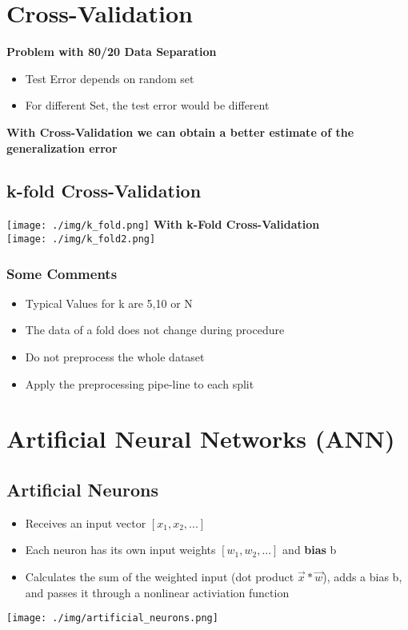 \section{Cross-Validation}
\textbf{Problem with 80/20 Data Separation}
\begin{itemize}
    \item Test Error depends on random set
    \item For different Set, the test error would be different
\end{itemize}
\textbf{With Cross-Validation we can obtain a better estimate of the generalization error}
\subsection{k-fold Cross-Validation}
\texttt{[image: ./img/k\_fold.png]}
\textbf{With k-Fold Cross-Validation}\\
\texttt{[image: ./img/k\_fold2.png]}

\subsubsection{Some Comments}
\begin{itemize}
    \item Typical Values for k are 5,10 or N
    \item The data of a fold does not change during procedure
    \item Do not preprocess the whole dataset
    \item Apply the preprocessing pipe-line to each split
\end{itemize}

\section{Artificial Neural Networks (ANN)}
\subsection{Artificial Neurons}
\begin{itemize}
    \item Receives an input vector $[x_1,x_2, ...]$
    \item Each neuron has its own input weights $[w_1, w_2, ...]$ and \textbf{bias} b
    \item Calculates the sum of the weighted input (dot product $\vec{x} * \vec{w}$), adds a bias b, and passes it through a nonlinear activiation function
\end{itemize}
\texttt{[image: ./img/artificial\_neurons.png]}


